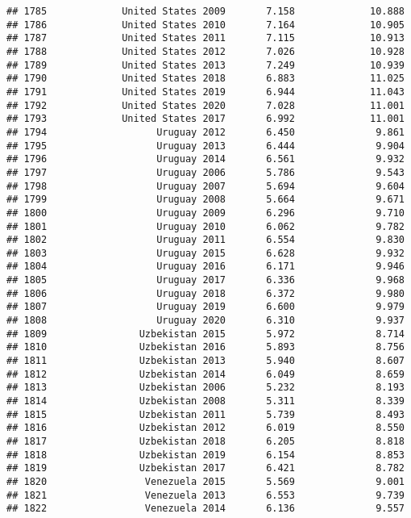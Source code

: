 \documentclass[
]{article}
\begin{document}
\begin{verbatim}
## 1785             United States 2009       7.158             10.888
## 1786             United States 2010       7.164             10.905
## 1787             United States 2011       7.115             10.913
## 1788             United States 2012       7.026             10.928
## 1789             United States 2013       7.249             10.939
## 1790             United States 2018       6.883             11.025
## 1791             United States 2019       6.944             11.043
## 1792             United States 2020       7.028             11.001
## 1793             United States 2017       6.992             11.001
## 1794                   Uruguay 2012       6.450              9.861
## 1795                   Uruguay 2013       6.444              9.904
## 1796                   Uruguay 2014       6.561              9.932
## 1797                   Uruguay 2006       5.786              9.543
## 1798                   Uruguay 2007       5.694              9.604
## 1799                   Uruguay 2008       5.664              9.671
## 1800                   Uruguay 2009       6.296              9.710
## 1801                   Uruguay 2010       6.062              9.782
## 1802                   Uruguay 2011       6.554              9.830
## 1803                   Uruguay 2015       6.628              9.932
## 1804                   Uruguay 2016       6.171              9.946
## 1805                   Uruguay 2017       6.336              9.968
## 1806                   Uruguay 2018       6.372              9.980
## 1807                   Uruguay 2019       6.600              9.979
## 1808                   Uruguay 2020       6.310              9.937
## 1809                Uzbekistan 2015       5.972              8.714
## 1810                Uzbekistan 2016       5.893              8.756
## 1811                Uzbekistan 2013       5.940              8.607
## 1812                Uzbekistan 2014       6.049              8.659
## 1813                Uzbekistan 2006       5.232              8.193
## 1814                Uzbekistan 2008       5.311              8.339
## 1815                Uzbekistan 2011       5.739              8.493
## 1816                Uzbekistan 2012       6.019              8.550
## 1817                Uzbekistan 2018       6.205              8.818
## 1818                Uzbekistan 2019       6.154              8.853
## 1819                Uzbekistan 2017       6.421              8.782
## 1820                 Venezuela 2015       5.569              9.001
## 1821                 Venezuela 2013       6.553              9.739
## 1822                 Venezuela 2014       6.136              9.557

\end{verbatim}
\end{document}
